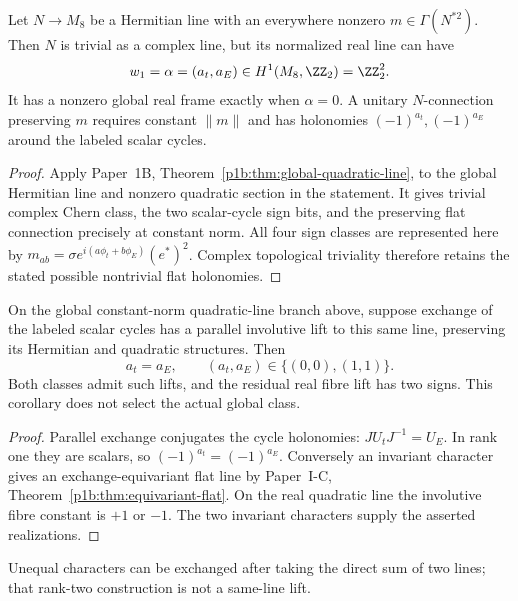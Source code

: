 \documentclass[12pt,a4paper]{article}
\begin{document}
\begin{proposition}
\label{p5:prop:global-m8-quadratic-sign-class}
Let \(N\to M_8\) be a Hermitian line with an everywhere
nonzero \(m\in\Gamma(N^{*2})\).  Then \(N\) is trivial
as a complex line, but its normalized real line can have
\[
 w_1=\alpha=(a_t,a_E)\in H^1(M_8,\ZZ_2)=\ZZ_2^2.
\]
It has a nonzero global real frame exactly when
\(\alpha=0\).  A unitary \(N\)-connection preserving \(m\)
requires constant \(\|m\|\) and has holonomies
\((-1)^{a_t},(-1)^{a_E}\) around the labeled scalar cycles.
\end{proposition}
\begin{proof}
Apply Paper~1B, Theorem~\ref{p1b:thm:global-quadratic-line}, to
the global Hermitian line and nonzero quadratic section in the statement.
It gives trivial complex Chern class, the two scalar-cycle sign bits,
and the preserving flat connection precisely at constant norm.
All four sign classes are represented here by
$m_{ab}=\sigma e^{i(a\phi_t+b\phi_E)}(e^*)^2$.
Complex topological triviality therefore retains the stated possible
nontrivial flat holonomies.
\end{proof}

\begin{corollary}
\label{p5:cor:exchange-compatible-quadratic-line-signs}
On the global constant-norm quadratic-line branch above, suppose exchange
of the labeled scalar cycles has a parallel involutive lift to this same
line, preserving its Hermitian and quadratic structures. Then
\[
 a_t=a_E,\qquad (a_t,a_E)\in\{(0,0),(1,1)\}.
\]
Both classes admit such lifts, and the residual real fibre lift has two
signs. This corollary does not select the actual global class.
\end{corollary}
\begin{proof}
Parallel exchange conjugates the cycle holonomies:
\(J U_tJ^{-1}=U_E\). In rank one they are scalars, so
\((-1)^{a_t}=(-1)^{a_E}\).
Conversely an invariant character gives an exchange-equivariant flat
line by Paper~I-C, Theorem~\ref{p1b:thm:equivariant-flat}.
On the real quadratic line the involutive fibre constant is \(+1\)
or \(-1\). The two invariant characters supply the asserted realizations.
\end{proof}
Unequal characters can be exchanged after taking the direct sum of two
lines; that rank-two construction is not a same-line lift.
\end{document}
